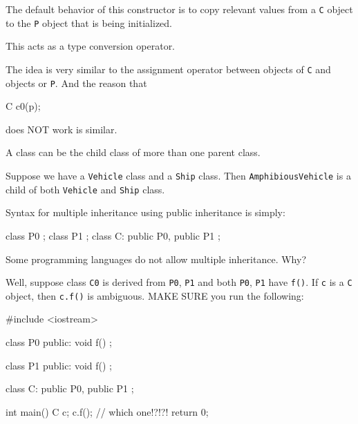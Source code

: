 The default behavior of this constructor is to copy relevant values from
a \verb!C! object to the \verb!P! object that is being initialized.

This acts as a type conversion operator.

The idea is very similar to the assignment operator between objects of
\verb!C! and objects or \verb!P!. And the reason that
\begin{console}
C c0(p);
\end{console}

does NOT work is similar.

\newpage{}

A class can be the child class of more than one parent class.

Suppose we have a \verb!Vehicle! class and a \verb!Ship! class. Then \verb!AmphibiousVehicle! is a child of both \verb!Vehicle! and \verb!Ship! class.

Syntax for multiple inheritance using public inheritance is simply:

\begin{console}
class P0 {};
class P1 {};
class C: public P0, public P1 {}; 
\end{console}

Some programming languages do not allow multiple inheritance. Why?

Well, suppose class \verb!C0! is derived from \verb!P0!, \verb!P1! and both \verb!P0!, \verb!P1! have \verb!f()!. If \verb!c! is a \verb!C! object, then \verb!c.f()! is ambiguous. MAKE SURE you run the following:
\begin{console}
#include <iostream>

class P0
{
public:
        void f() {}
};

class P1
{
public:
        void f() {}
};

class C: public P0, public P1
{};

int main()
{   
    C c;
    c.f(); // which one!?!?!
    return 0;
}
\end{console}

